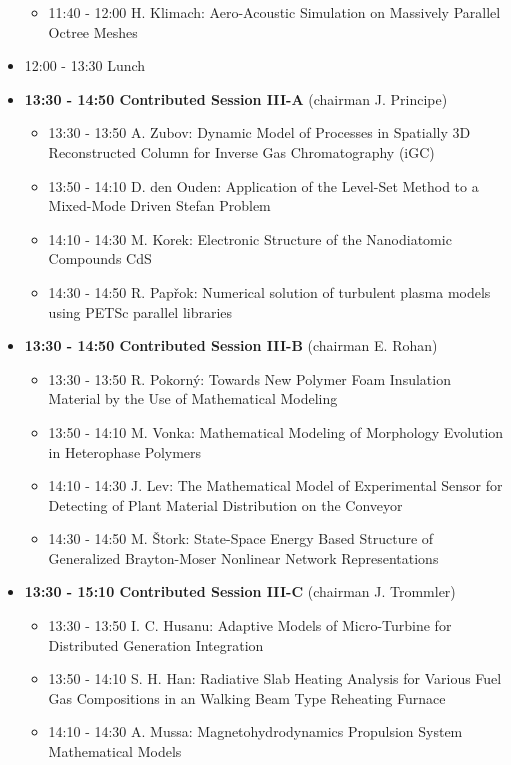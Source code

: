 \documentclass[10pt, A4]{article}%
\begin{document}
\begin{itemize}
\begin{itemize}
    \item 11:40 - 12:00 H. Klimach: Aero-Acoustic Simulation on Massively Parallel Octree Meshes
  \end{itemize}
  \item 12:00 - 13:30 Lunch
  \item {\bf 13:30 - 14:50 Contributed Session III-A} (chairman J. Principe) 
  \begin{itemize}
    \item 13:30 - 13:50 A. Zubov: Dynamic Model of Processes in Spatially 3D Reconstructed Column for Inverse Gas Chromatography (iGC)
    \item 13:50 - 14:10 D. den Ouden: Application of the Level-Set Method to a Mixed-Mode Driven Stefan Problem
    \item 14:10 - 14:30 M. Korek: Electronic Structure of the Nanodiatomic Compounds CdS
    \item 14:30 - 14:50 R. Pap\v{r}ok: Numerical solution of turbulent plasma models using PETSc parallel libraries
  \end{itemize}
  \item {\bf 13:30 - 14:50 Contributed Session III-B} (chairman E. Rohan) 
  \begin{itemize}
    \item 13:30 - 13:50 R. Pokorn\'{y}: Towards New Polymer Foam Insulation Material by the Use of Mathematical Modeling
    \item 13:50 - 14:10 M. Vonka: Mathematical Modeling of Morphology Evolution in Heterophase Polymers
    \item 14:10 - 14:30 J. Lev: The Mathematical Model of Experimental Sensor for Detecting of Plant Material Distribution on the Conveyor
    \item 14:30 - 14:50 M. \v{S}tork: State-Space Energy Based Structure of Generalized Brayton-Moser Nonlinear Network Representations
  \end{itemize}
    \item {\bf 13:30 - 15:10 Contributed Session III-C} (chairman J. Trommler) 
  \begin{itemize}
    \item 13:30 - 13:50 I. C. Husanu: Adaptive Models of Micro-Turbine for Distributed Generation Integration 
    \item 13:50 - 14:10 S. H. Han: Radiative Slab Heating Analysis for Various Fuel Gas Compositions in an Walking Beam Type Reheating Furnace
    \item 14:10 - 14:30 A. Mussa: Magnetohydrodynamics Propulsion System Mathematical Models

\end{itemize}
\end{itemize}
\end{document}
